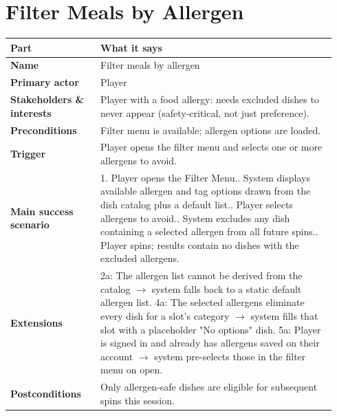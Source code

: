\documentclass[11pt,twocolumn]{article}
\newcommand{\ucheader}{%
\textbf{Part} & \textbf{What it says} \\
\hline
\endhead
\hline
\endfoot
}
\begin{document}
\section{Filter Meals by Allergen}
{\footnotesize
\begin{longtable}{@{}p{0.26\linewidth}p{0.68\linewidth}@{}}
\hline
\ucheader
\textbf{Name} & Filter meals by allergen \\
\hline
\textbf{Primary actor} & Player \\
\hline
\textbf{Stakeholders \& interests} & Player with a food allergy: needs excluded dishes to never appear (safety-critical, not just preference). \\
\hline
\textbf{Preconditions} & Filter menu is available; allergen options are loaded. \\
\hline
\textbf{Trigger} & Player opens the filter menu and selects one or more allergens to avoid. \\
\hline
\textbf{Main success scenario} & 1. Player opens the Filter Menu.\newline
2. System displays available allergen and tag options drawn from the dish catalog plus a default list.\newline
3. Player selects allergens to avoid.\newline
4. System excludes any dish containing a selected allergen from all future spins.\newline
5. Player spins; results contain no dishes with the excluded allergens. \\
\hline
\textbf{Extensions} & 2a: The allergen list cannot be derived from the catalog $\rightarrow$ system falls back to a static default allergen list.\newline
4a: The selected allergens eliminate every dish for a slot's category $\rightarrow$ system fills that slot with a placeholder "No options" dish.\newline
5a: Player is signed in and already has allergens saved on their account $\rightarrow$ system pre-selects those in the filter menu on open. \\
\hline
\textbf{Postconditions} & Only allergen-safe dishes are eligible for subsequent spins this session. \\
\hline
\end{longtable}
}
\end{document}
